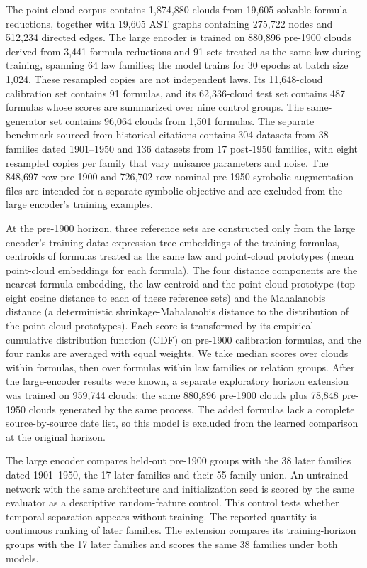 \documentclass{article}
\begin{document}
The point-cloud corpus contains 1,874,880 clouds from 19,605 solvable formula reductions, together with 19,605 AST graphs containing 275,722 nodes and 512,234 directed edges. The large encoder is trained on 880,896 pre-1900 clouds derived from 3,441 formula reductions and 91 sets treated as the same law during training, spanning 64 law families; the model trains for 30 epochs at batch size 1,024. These resampled copies are not independent laws. Its 11,648-cloud calibration set contains 91 formulas, and its 62,336-cloud test set contains 487 formulas whose scores are summarized over nine control groups. The same-generator set contains 96,064 clouds from 1,501 formulas. The separate benchmark sourced from historical citations contains 304 datasets from 38 families dated 1901--1950 and 136 datasets from 17 post-1950 families, with eight resampled copies per family that vary nuisance parameters and noise. The 848,697-row pre-1900 and 726,702-row nominal pre-1950 symbolic augmentation files are intended for a separate symbolic objective and are excluded from the large encoder's training examples.

At the pre-1900 horizon, three reference sets are constructed only from the large encoder's training data: expression-tree embeddings of the training formulas, centroids of formulas treated as the same law and point-cloud prototypes (mean point-cloud embeddings for each formula). The four distance components are the nearest formula embedding, the law centroid and the point-cloud prototype (top-eight cosine distance to each of these reference sets) and the Mahalanobis distance (a deterministic shrinkage-Mahalanobis distance to the distribution of the point-cloud prototypes). Each score is transformed by its empirical cumulative distribution function (CDF) on pre-1900 calibration formulas, and the four ranks are averaged with equal weights. We take median scores over clouds within formulas, then over formulas within law families or relation groups. After the large-encoder results were known, a separate exploratory horizon extension was trained on 959,744 clouds: the same 880,896 pre-1900 clouds plus 78,848 pre-1950 clouds generated by the same process. The added formulas lack a complete source-by-source date list, so this model is excluded from the learned comparison at the original horizon.

The large encoder compares held-out pre-1900 groups with the 38 later families dated 1901--1950, the 17 later families and their 55-family union. An untrained network with the same architecture and initialization seed is scored by the same evaluator as a descriptive random-feature control. This control tests whether temporal separation appears without training. The reported quantity is continuous ranking of later families. The extension compares its training-horizon groups with the 17 later families and scores the same 38 families under both models. 
\end{document}
